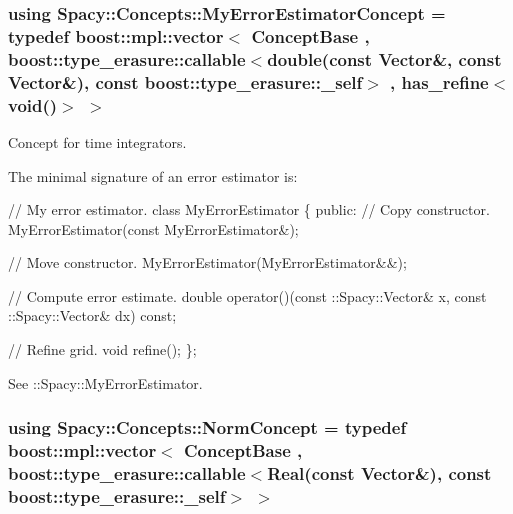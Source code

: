 \subsubsection[{My\+Error\+Estimator\+Concept}]{\setlength{\rightskip}{0pt plus 5cm}using {\bf Spacy\+::\+Concepts\+::\+My\+Error\+Estimator\+Concept} = typedef boost\+::mpl\+::vector$<$ Concept\+Base , boost\+::type\+\_\+erasure\+::callable$<$double(const Vector\&, const Vector\&), const boost\+::type\+\_\+erasure\+::\+\_\+self$>$ , has\+\_\+refine$<$void()$>$ $>$}\label{group__ConceptGroup_ga6b5c97b0e58318ef98c43a9b8a7dae08_ga6b5c97b0e58318ef98c43a9b8a7dae08}


Concept for time integrators. 

\label{group__ConceptGroup_ga6b5c97b0e58318ef98c43a9b8a7dae08_ErrorEstimatorConceptAnchor}%
\hypertarget{group__ConceptGroup_ga6b5c97b0e58318ef98c43a9b8a7dae08_ErrorEstimatorConceptAnchor}{}%
The minimal signature of an error estimator is\+: 
\begin{DoxyCode}
\textcolor{comment}{// My error estimator.}
\textcolor{keyword}{class }MyErrorEstimator
\{
\textcolor{keyword}{public}:
  \textcolor{comment}{// Copy constructor.}
  MyErrorEstimator(\textcolor{keyword}{const} MyErrorEstimator&);

  \textcolor{comment}{// Move constructor.}
  MyErrorEstimator(MyErrorEstimator&&);

  \textcolor{comment}{// Compute error estimate.}
  \textcolor{keywordtype}{double} operator()(const ::Spacy::Vector& x, const ::Spacy::Vector& dx) \textcolor{keyword}{const};

  \textcolor{comment}{// Refine grid.}
  \textcolor{keywordtype}{void} refine();
\};
\end{DoxyCode}


See \+:\+:Spacy\+:\+:My\+Error\+Estimator. \hypertarget{group__ConceptGroup_ga8b6032c46f6e31840a2c956c6360549b_ga8b6032c46f6e31840a2c956c6360549b}{}
\subsubsection[{Norm\+Concept}]{\setlength{\rightskip}{0pt plus 5cm}using {\bf Spacy\+::\+Concepts\+::\+Norm\+Concept} = typedef boost\+::mpl\+::vector$<$ Concept\+Base , boost\+::type\+\_\+erasure\+::callable$<$Real(const Vector\&), const boost\+::type\+\_\+erasure\+::\+\_\+self$>$ $>$}\label{group__ConceptGroup_ga8b6032c46f6e31840a2c956c6360549b_ga8b6032c46f6e31840a2c956c6360549b}


